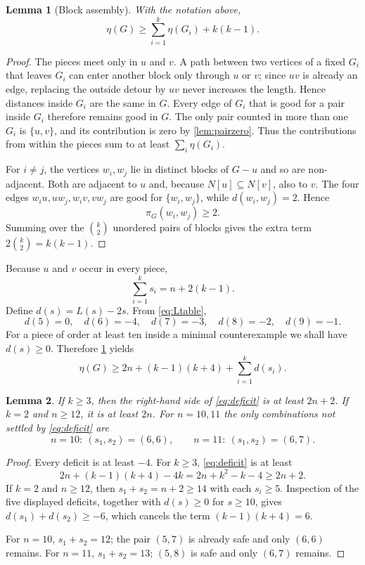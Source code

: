 \documentclass[11pt,reqno]{amsart}
\newtheorem{lemma}[lemma]{Lemma}
\theoremstyle{definition}
\theoremstyle{remark}
\newcommand{\pairc}{\pi}
\begin{document}
\begin{lemma}[Block assembly]\label{lem:blockassembly}
With the notation above,
\[
  \eta(G)\ge \sum_{i=1}^k\eta(G_i)+k(k-1).
\]
\end{lemma}

\begin{proof}
The pieces meet only in $u$ and $v$.  A path between two vertices of a fixed
$G_i$ that leaves $G_i$ can enter another block only through $u$ or $v$;
since $uv$ is already an edge, replacing the outside detour by $uv$ never
increases the length.  Hence distances inside $G_i$ are the same in $G$.
Every edge of $G_i$ that is good for a pair inside $G_i$ therefore remains
good in $G$.  The only pair counted in more than one $G_i$ is $\{u,v\}$,
and its contribution is zero by \cref{lem:pairzero}.  Thus the contributions
from within the pieces sum to at least $\sum_i\eta(G_i)$.

For $i\ne j$, the vertices $w_i,w_j$ lie in distinct blocks of $G-u$ and so
are non-adjacent.  Both are adjacent to $u$ and, because
$N[u]\subseteq N[v]$, also to $v$.  The four edges
$w_i u,uw_j,w_i v,vw_j$ are good for $\{w_i,w_j\}$, while
$d(w_i,w_j)=2$.  Hence
\[
  \pairc_G(w_i,w_j)\ge2.
\]
Summing over the $\binom{k}{2}$ unordered pairs of blocks gives the extra
term $2\binom{k}{2}=k(k-1)$.
\end{proof}

Because $u$ and $v$ occur in every piece,
\[
  \sum_{i=1}^k s_i=n+2(k-1).
\]
Define $d(s)=L(s)-2s$.  From \eqref{eq:Ltable},
\[
 d(5)=0,\quad d(6)=-4,\quad d(7)=-3,\quad d(8)=-2,\quad d(9)=-1.
\]
For a piece of order at least ten inside a minimal counterexample we shall
have $d(s)\ge0$.  Therefore \cref{lem:blockassembly} yields
\begin{equation}\label{eq:deficit}
 \eta(G)\ge 2n+(k-1)(k+4)+\sum_{i=1}^k d(s_i).
\end{equation}

\begin{lemma}\label{lem:deficits}
If $k\ge3$, then the right-hand side of \eqref{eq:deficit} is at least
$2n+2$.  If $k=2$ and $n\ge12$, it is at least $2n$.  For $n=10,11$ the only
combinations not settled by \eqref{eq:deficit} are
\[
 n=10:\ (s_1,s_2)=(6,6),\qquad
 n=11:\ (s_1,s_2)=(6,7).
\]
\end{lemma}

\begin{proof}
Every deficit is at least $-4$.  For $k\ge3$, \eqref{eq:deficit} is at least
\[
 2n+(k-1)(k+4)-4k=2n+k^2-k-4\ge2n+2.
\]
If $k=2$ and $n\ge12$, then $s_1+s_2=n+2\ge14$ with each $s_i\ge5$.
Inspection of the five displayed deficits, together with $d(s)\ge0$ for
$s\ge10$, gives $d(s_1)+d(s_2)\ge-6$, which cancels the term
$(k-1)(k+4)=6$.

For $n=10$, $s_1+s_2=12$; the pair $(5,7)$ is already safe and only $(6,6)$
remains.  For $n=11$, $s_1+s_2=13$; $(5,8)$ is safe and only $(6,7)$ remains.
\end{proof}
\end{document}
